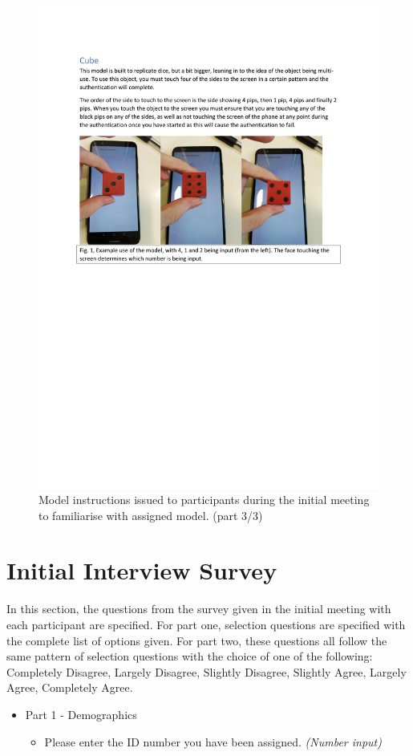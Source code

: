 \documentclass{l4proj}
\begin{document}
\begin{appendices}
\begin{figure}
    \centering
    \includegraphics[page=3,width=\linewidth]{Appendices/Model Instructions.pdf}
    \caption{Model instructions issued to participants during the initial meeting to familiarise with assigned model. (part 3/3)}
    \label{fig:interaction3}
\end{figure}

\newpage

\chapter{Initial Interview Survey}
\label{sec:demo}
In this section, the questions from the survey given in the initial meeting with each participant are specified. For part one, selection questions are specified with the complete list of options given. For part two, these questions all follow the same pattern of selection questions with the choice of one of the following: Completely Disagree, Largely Disagree, Slightly Disagree, Slightly Agree, Largely Agree, Completely Agree.
\begin{itemize}
    \item Part 1 - Demographics
    \begin{itemize}
        \item Please enter the ID number you have been assigned. \textit{(Number input)}


\end{itemize}
\end{itemize}
\end{appendices}
\end{document}
